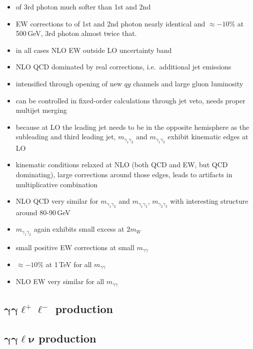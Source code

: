 \begin{itemize}
  \item \pT of 3rd photon much softer than 1st and 2nd
  \item EW corrections to \pT of 1st and 2nd photon nearly identical and 
        $\approx -10\%$ at 500\,GeV, 3rd photon almost twice that.
  \item in all cases NLO EW outside LO uncertainty band
  \item NLO QCD dominated by real corrections, i.e.\ additional 
        jet emissions
  \item intensified through opening of new $qg$ channels and large 
        gluon luminosity
  \item can be controlled in fixed-order calculations through jet veto, 
        needs proper multijet merging
  \item because at LO the leading jet needs to be in the opposite 
        hemisphere as the subleading and third leading jet, 
        $m_{\gamma_1\gamma_2}$ and $m_{\gamma_1\gamma_3}$ 
        exhibit kinematic edges at LO
  \item kinematic conditions relaxed at NLO (both QCD and EW, 
        but QCD dominating), large corrections around those edges, 
        leads to artifacts in multiplicative combination
  \item NLO QCD very similar for $m_{\gamma_1\gamma_2}$ and 
	$m_{\gamma_1\gamma_3}$, $m_{\gamma_2\gamma_3}$ with interesting 
	structure around 80-90\,GeV
  \item $m_{\gamma_1\gamma_2}$ again exhibits small excess at $2m_W$
  \item small positive EW corrections at small $m_{\gamma\gamma}$ 
  \item $\approx -10\%$ at 1\,TeV for all $m_{\gamma\gamma}$ 
  \item NLO EW very similar for all $m_{\gamma\gamma}$ 
\end{itemize}



\subsection{\texorpdfstring{$\boldsymbol{\gamma\gamma\ell^+\ell^-}$}{aall} production}
\label{sec:results:aaz}

\subsection{\texorpdfstring{$\boldsymbol{\gamma\gamma\ell\nu}$}{aalnu} production}
\label{sec:results:aaw}



